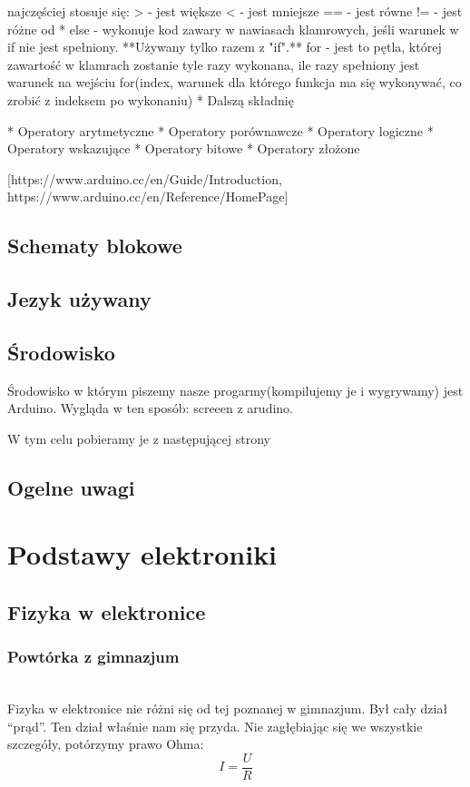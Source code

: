\documentclass[a4paper,10pt]{report}
\begin{document}
		najczęściej stosuje się:
		> - jest większe
		< - jest mniejsze
		== - jest równe
		!= - jest różne od
    * else - wykonuje kod zawary w nawiasach klamrowych, jeśli warunek w if nie jest spełniony. **Używany tylko razem z "if".**
	for - jest to pętla, której zawartość w klamrach zostanie tyle razy wykonana, ile razy spełniony jest warunek na wejściu 
	for(index, warunek dla którego funkcja ma się wykonywać, co zrobić z indeksem po wykonaniu)
  * Dalszą składnię
  
  * Operatory arytmetyczne
  * Operatory porównawcze
  * Operatory logiczne
  * Operatory wskazujące
  * Operatory bitowe
  * Operatory złożone

[https://www.arduino.cc/en/Guide/Introduction, https://www.arduino.cc/en/Reference/HomePage]

	\section {Schematy blokowe}
	\section{Jezyk używany}
	\section{Środowisko}
		Środowisko w którym piszemy nasze progarmy(kompilujemy je i wygrywamy) jest Arduino. Wygląda w ten sposób: screeen z arudino. 
		
W tym celu pobieramy je z następującej strony
	\section{Ogelne uwagi}
\chapter{Podstawy elektroniki}
 \section{Fizyka w elektronice}
	\subsection{Powtórka z gimnazjum}
	\\Fizyka w elektronice nie różni się od tej poznanej w gimnazjum. Był cały dział "`prąd"'. Ten dział właśnie nam się przyda. Nie zagłębiając się we wszystkie szczegóły, potórzymy prawo Ohma:
	\[
	I=\frac{U}{R}
\]
\end{document}

